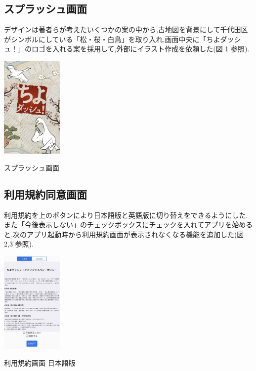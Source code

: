 \documentclass[a4paper, twoside]{jarticle}
\makeatletter
\newenvironment{figurehere}
  {\def\@captype{figure}}
  {}
\makeatother
\begin{document}
\begin{multicols}{2}
\subsection{スプラッシュ画面}
デザインは著者らが考えたいくつかの案の中から,古地図を背景にして千代田区がシンボルにしている「松・桜・白鳥」を取り入れ,画面中央に「ちよダッシュ！」のロゴを入れる案を採用して,外部にイラスト作成を依頼した(図 1 参照).

\begin{figurehere}
\begin{center}
\includegraphics[bb=30 50 550 1300,width=3cm]{./image01.jpg}%
\end{center}
\caption{スプラッシュ画面}\label{fig:1}
\end{figurehere}

\subsection{利用規約同意画面}
利用規約を上のボタンにより日本語版と英語版に切り替えをできるようにした.
また「今後表示しない」のチェックボックスにチェックを入れてアプリを始めると,次のアプリ起動時から利用規約画面が表示されなくなる機能を追加した(図 2,3 参照).
\begin{figurehere}
\begin{center}
\includegraphics[bb=30 50 550 1300,width=3cm]{./image02.jpg}%
\end{center}
\caption{利用規約画面 日本語版}\label{fig:2}


\end{figurehere}
\end{multicols}
\end{document}
